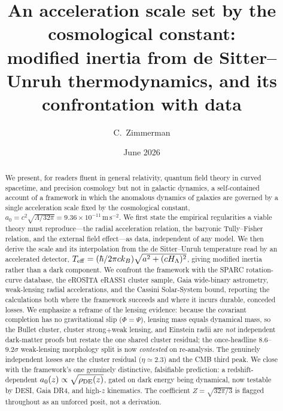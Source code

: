 \documentclass[aps,prd,twocolumn,10pt,nofootinbib,superscriptaddress]{revtex4-2}
\begin{document}
\title{An acceleration scale set by the cosmological constant:\\
modified inertia from de Sitter--Unruh thermodynamics, and its confrontation with data}
\author{C.\ Zimmerman}
\date{June 2026}

\begin{abstract}
We present, for readers fluent in general relativity, quantum field theory in curved spacetime, and precision
cosmology but not in galactic dynamics, a self-contained account of a framework in which the anomalous dynamics of
galaxies are governed by a single acceleration scale fixed by the cosmological constant,
$a_0=c^2\sqrt{\Lambda/32\pi}=9.36\times10^{-11}\,\mathrm{m\,s^{-2}}$. We first state the empirical regularities a
viable theory must reproduce---the radial acceleration relation, the baryonic Tully--Fisher relation, and the
external field effect---as data, independent of any model. We then derive the scale and its interpolation from the
de Sitter--Unruh temperature read by an accelerated detector, $T_{\rm eff}=(\hbar/2\pi c k_B)\sqrt{a^2+(cH_\Lambda)^2}$,
giving modified inertia rather than a dark component. We confront the framework with the SPARC rotation-curve
database, the eROSITA eRASS1 cluster sample, Gaia wide-binary astrometry, weak-lensing radial accelerations, and the
Cassini Solar-System bound, reporting the calculations both where the framework succeeds and where it incurs durable,
conceded losses. We emphasize a reframe of the lensing evidence: because the covariant completion has no
gravitational slip ($\Phi=\Psi$), lensing mass equals dynamical mass, so the Bullet cluster, cluster strong$+$weak
lensing, and Einstein radii are \emph{not} independent dark-matter proofs but restate the one shared cluster
residual; the once-headline $8.6$--$9.2\sigma$ weak-lensing morphology split is now \emph{contested} on
re-analysis. The genuinely independent losses are the cluster residual ($\eta\!\simeq\!2.3$) and the CMB third
peak. We close with the framework's one genuinely distinctive, falsifiable prediction: a redshift-dependent $a_0(z)
\propto\sqrt{\rho_{\rm DE}(z)}$, gated on dark energy being dynamical, now testable by DESI, Gaia DR4, and high-$z$
kinematics. The coefficient $Z=\sqrt{32\pi/3}$ is flagged throughout as an unforced posit, not a derivation.
\end{abstract}

\maketitle
\end{document}
